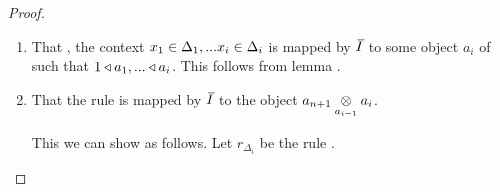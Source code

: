 \begin{proof}
\begin{enumerate}
\item That \foreachi, the context $\xDelta{i}$ is mapped by $\Ibar$ to some object $a_i$ of \catcw such
that $1 \base a_1,...\base a_i$. This follows from lemma . 

\item That the rule  is mapped by $\Ibar$ to the object $\crossx{a_{n+1}}{a_i}{a_{i-1}}$.

This we can show as follows.
\newcommand{\deltaimapped}{\crossx{a_{n+1}}{a_i}{a_{i-1}}}
\newcommand{\deltaimappedlong}{s(p_{a_{n+1},a_{i-1}})^*...s(p_{a_{n+1},a_1})^*(\crossx{a_{n+1}}{a_i}{1})}
Let $r_{\Delta_i}$ be the rule .




\end{enumerate}
\end{proof}
